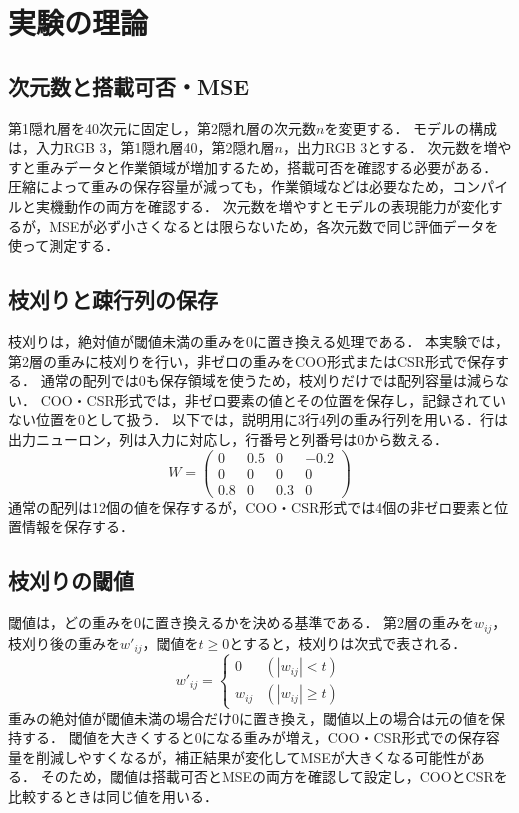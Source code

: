 \documentclass[a4paper,11pt]{article}
\begin{document}
\section{実験の理論}
\subsection{次元数と搭載可否・MSE}
第1隠れ層を40次元に固定し，第2隠れ層の次元数$n$を変更する．
モデルの構成は，入力RGB 3，第1隠れ層40，第2隠れ層$n$，出力RGB 3とする．
次元数を増やすと重みデータと作業領域が増加するため，搭載可否を確認する必要がある．
圧縮によって重みの保存容量が減っても，作業領域などは必要なため，コンパイルと実機動作の両方を確認する．
次元数を増やすとモデルの表現能力が変化するが，MSEが必ず小さくなるとは限らないため，各次元数で同じ評価データを使って測定する．

\subsection{枝刈りと疎行列の保存}
枝刈りは，絶対値が閾値未満の重みを0に置き換える処理である\cite{han-pruning}．
本実験では，第2層の重みに枝刈りを行い，非ゼロの重みをCOO形式またはCSR形式で保存する．
通常の配列では0も保存領域を使うため，枝刈りだけでは配列容量は減らない．
COO・CSR形式では，非ゼロ要素の値とその位置を保存し，記録されていない位置を0として扱う．
以下では，説明用に3行4列の重み行列を用いる．行は出力ニューロン，列は入力に対応し，行番号と列番号は0から数える．
\[
 W=\begin{pmatrix}
 0 & 0.5 & 0 & -0.2\\
 0 & 0 & 0 & 0\\
 0.8 & 0 & 0.3 & 0
 \end{pmatrix}
\]
通常の配列は12個の値を保存するが，COO・CSR形式では4個の非ゼロ要素と位置情報を保存する．

\subsection{枝刈りの閾値}
閾値は，どの重みを0に置き換えるかを決める基準である．
第2層の重みを$w_{ij}$，枝刈り後の重みを$w'_{ij}$，閾値を$t\geq0$とすると，枝刈りは次式で表される．
\[
  w'_{ij}=\begin{cases}
  0 & (|w_{ij}|<t)\\
  w_{ij} & (|w_{ij}|\geq t)
  \end{cases}
\]
重みの絶対値が閾値未満の場合だけ0に置き換え，閾値以上の場合は元の値を保持する．
閾値を大きくすると0になる重みが増え，COO・CSR形式での保存容量を削減しやすくなるが，補正結果が変化してMSEが大きくなる可能性がある．
そのため，閾値は搭載可否とMSEの両方を確認して設定し，COOとCSRを比較するときは同じ値を用いる．
\end{document}
